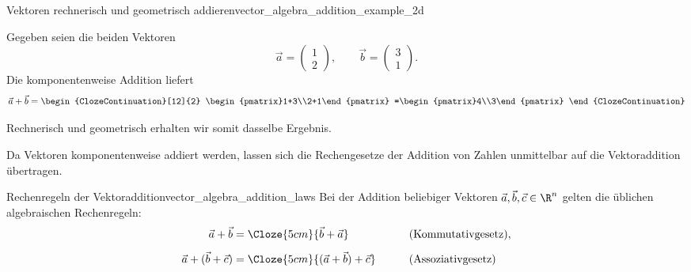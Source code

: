 \begin{ExampleBox}{Vektoren rechnerisch und geometrisch addieren}{vector_algebra_addition_example_2d}
  \begin{minipage}[c]{0.52\linewidth}
    Gegeben seien die beiden Vektoren
    \[
      \vec a=\begin{pmatrix}1\\2\end{pmatrix},
      \qquad
      \vec b=\begin{pmatrix}3\\1\end{pmatrix}.
    \]
    Die komponentenweise Addition liefert
    \[
      \vec a+\vec b=
      \begin{ClozeContinuation}[12]{2}
        \begin{pmatrix}1+3\\2+1\end{pmatrix}
        =\begin{pmatrix}4\\3\end{pmatrix}
      \end{ClozeContinuation}
    \]
  \end{minipage}\hfill
  \begin{minipage}[c]{0.44\linewidth}
    \centering
  \end{minipage}
  \par\smallskip
  Rechnerisch und geometrisch erhalten wir somit dasselbe Ergebnis.
\end{ExampleBox}

Da Vektoren komponentenweise addiert werden, lassen sich die Rechengesetze
der Addition von Zahlen unmittelbar auf die Vektoraddition übertragen.

\begin{TheoremBox}{Rechenregeln der Vektoraddition}{vector_algebra_addition_laws}
  Bei der Addition beliebiger Vektoren $\vec a,\vec b,\vec c\in\R^n$ gelten die
  üblichen algebraischen Rechenregeln:
  \[
    \begin{aligned}
      \vec a+\vec b
        &=\Cloze{5cm}{\vec b+\vec a}
        &&\qquad\text{(Kommutativgesetz)},\\[0.5em]
      \vec a+(\vec b+\vec c)
        &=\Cloze{5cm}{(\vec a+\vec b)+\vec c}
        &&\qquad\text{(Assoziativgesetz)}
    \end{aligned}
  \]
\end{TheoremBox}

